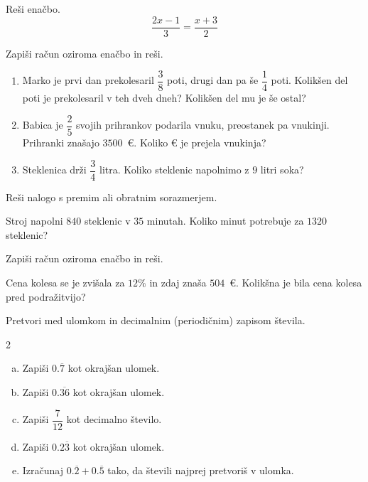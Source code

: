 \documentclass[a4paper,12pt]{letter}
\begin{document}
\begin{naloga}
Re\v{s}i ena\v{c}bo.
$$\dfrac{2x-1}{3}=\dfrac{x+3}{2}$$
\end{naloga}

\begin{naloga}
Zapi\v{s}i ra\v{c}un oziroma ena\v{c}bo in re\v{s}i.

\begin{enumerate}[1.)]
\item Marko je prvi dan prekolesaril $\dfrac{3}{8}$ poti, drugi dan pa \v{s}e $\dfrac{1}{4}$ poti.
Kolik\v{s}en del poti je prekolesaril v teh dveh dneh? Kolik\v{s}en del mu je \v{s}e ostal?
\item Babica je $\dfrac{2}{5}$ svojih prihrankov podarila vnuku, preostanek pa vnukinji.
Prihranki zna\v{s}ajo $3500$~\euro{}. Koliko \euro{} je prejela vnukinja?
\item Steklenica drži $\dfrac{3}{4}$ litra. Koliko steklenic napolnimo z $9$ litri soka?
\end{enumerate}
\end{naloga}

\begin{naloga}
Re\v{s}i nalogo s premim ali obratnim sorazmerjem.

Stroj napolni $840$ steklenic v $35$ minutah. Koliko minut potrebuje za $1320$ steklenic?
\end{naloga}

\begin{naloga}
Zapi\v{s}i ra\v{c}un oziroma ena\v{c}bo in re\v{s}i.

Cena kolesa se je zvi\v{s}ala za $12\%$ in zdaj zna\v{s}a $504$~\euro{}. Kolik\v{s}na je bila cena kolesa pred podra\v{z}itvijo?
\end{naloga}

\begin{naloga}
Pretvori med ulomkom in decimalnim (periodi\v{c}nim) zapisom \v{s}tevila.

\begin{multicols}{2}
\begin{enumerate}[a.)]
\item Zapi\v{s}i $0.\overline{7}$ kot okraj\v{s}an ulomek.
\item Zapi\v{s}i $0.\overline{36}$ kot okraj\v{s}an ulomek.
\item Zapi\v{s}i $\dfrac{7}{12}$ kot decimalno \v{s}tevilo.
\item Zapi\v{s}i $0.2\overline{3}$ kot okraj\v{s}an ulomek.
\item Izra\v{c}unaj $0.\overline{2}+0.\overline{5}$ tako, da \v{s}tevili najprej pretvori\v{s} v ulomka.
\end{enumerate}
\end{multicols}
\end{naloga}
\end{document}
